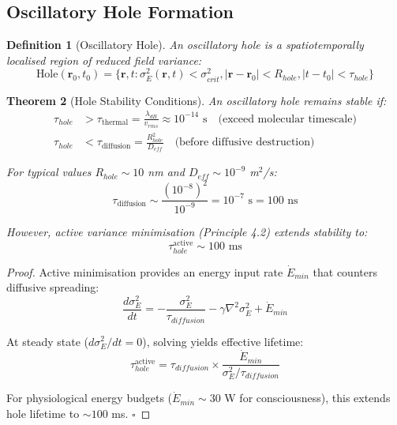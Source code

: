 \documentclass[12pt,a4paper]{article}
\newtheorem{theorem}{Theorem}[section]
\newtheorem{definition}[theorem]{Definition}
\begin{document}
\subsection{Oscillatory Hole Formation}

\begin{definition}[Oscillatory Hole]
An oscillatory hole is a spatiotemporally localised region of reduced field variance:
\begin{equation}
\text{Hole}(\mathbf{r}_0, t_0) = \{\mathbf{r}, t : \sigma^2_E(\mathbf{r}, t) < \sigma^2_{crit}, |\mathbf{r} - \mathbf{r}_0| < R_{hole}, |t - t_0| < \tau_{hole}\}
\end{equation}
\end{definition}

\begin{theorem}[Hole Stability Conditions]
An oscillatory hole remains stable if:
\begin{align}
\tau_{hole} &> \tau_{\text{thermal}} = \frac{\lambda_{dB}}{v_{rms}} \approx 10^{-14} \text{ s} \quad \text{(exceed molecular timescale)} \\
\tau_{hole} &< \tau_{\text{diffusion}} = \frac{R_{hole}^2}{D_{eff}} \quad \text{(before diffusive destruction)}
\end{align}

For typical values $R_{hole} \sim 10$ nm and $D_{eff} \sim 10^{-9}$ m$^2$/s:
\begin{equation}
\tau_{\text{diffusion}} \sim \frac{(10^{-8})^2}{10^{-9}} = 10^{-7} \text{ s} = 100 \text{ ns}
\end{equation}

However, active variance minimisation (Principle 4.2) extends stability to:
\begin{equation}
\tau_{hole}^{\text{active}} \sim 100 \text{ ms}
\end{equation}
\end{theorem}

\begin{proof}
Active minimisation provides an energy input rate $\dot{E}_{min}$ that counters diffusive spreading:
\begin{equation}
\frac{d\sigma^2_E}{dt} = -\frac{\sigma^2_E}{\tau_{diffusion}} - \gamma \nabla^2\sigma^2_E + \dot{E}_{min}
\end{equation}

At steady state ($d\sigma^2_E/dt = 0$), solving yields effective lifetime:
\begin{equation}
\tau_{hole}^{\text{active}} = \tau_{diffusion} \times \frac{\dot{E}_{min}}{\sigma^2_E / \tau_{diffusion}}
\end{equation}

For physiological energy budgets ($\dot{E}_{min} \sim 30$ W for consciousness), this extends hole lifetime to $\sim 100$ ms. $\square$
\end{proof}
\end{document}
